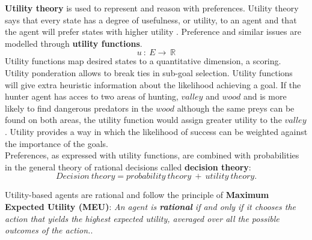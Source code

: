 \documentclass[11pt,oneside,a4paper,openright]{report}
\begin{document}
\begin{description}
\begin{description}
		\textbf{Utility theory} is used to represent and reason with preferences. Utility theory says that
		every state has a degree of usefulness, or utility, to an agent and that the agent will prefer 
		states with higher utility \cite{RussellNorvig}. Preference and similar issues are modelled through
		\textbf{utility functions}. 
			\begin{equation}
			 u\ :\ E \rightarrow \ \mathbb{R}
			\end{equation}
		Utility functions map desired states to a quantitative dimension, a scoring. Utility ponderation 
		allows to break ties in sub-goal selection. Utility functions will give extra heuristic information
		about the likelihood achieving a goal. If the hunter agent has acces to two areas of hunting, $valley$
		and $wood$ and is more likely to find dangerous predators in the $wood$ although the same preys can 
		be found on both areas, the utility function would assign greater utility to the $valley$. Utility
 		provides a way in which the likelihood of success can be weighted against the importance of the goals.\\
		Preferences, as expressed with utility functions, are combined with probabilities in the general 
		theory of rational decisions called \textbf{decision theory}: \cite{RussellNorvig}
			\begin{equation}
			Decision\ theory = probability\ theory\ +\ utility\ theory .
			\end{equation}

		Utility-based agents are rational and follow the principle of \textbf{Maximum Expected Utility (MEU)}: 
		\textit{An agent is \textbf{rational} if and only if it chooses the action that yields the highest
		expected utility, averaged over all the possible outcomes of the action.}\cite{RussellNorvig}.



	\end{description}


		
\end{description}


\end{document}
